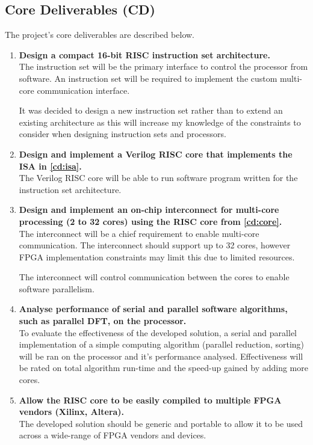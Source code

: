 \documentclass[11pt,a4paper]{report}
\begin{document}
{\subsection{Core Deliverables (CD)}
The project's core deliverables are described below.
\begin{enumerate}[leftmargin=2\parindent, label=\bfseries CD\arabic*]
\item{\textbf{Design a compact 16-bit RISC instruction set architecture.}\\
The instruction set will be the primary interface to control the processor from software. An instruction set will be required to implement the custom multi-core communication interface.

It was decided to design a new instruction set rather than to extend an existing architecture as this will increase my knowledge of the constraints to consider when designing instruction sets and processors.
}
\label{cd:isa}

\item{\textbf{Design and implement a Verilog RISC core that implements the ISA in \ref{cd:isa}.}\\
The Verilog RISC core will be able to run software program written for the instruction set architecture.
}\label{cd:core}

\item{\textbf{Design and implement an on-chip interconnect for multi-core processing (2 to 32 cores) using the RISC core from \ref{cd:core}.}\\
The interconnect will be a chief requirement to enable multi-core communication. The interconnect should support up to 32 cores, however FPGA implementation constraints may limit this due to limited resources.

The interconnect will control communication between the cores to enable software parallelism.
}\label{cd:interconnect}

\item{\textbf{Analyse performance of serial and parallel software algorithms, such as parallel DFT, on the processor.}\\
To evaluate the effectiveness of the developed solution, a serial and parallel implementation of a simple computing algorithm (parallel reduction, sorting) will be ran on the processor and it's performance analysed. Effectiveness will be rated on total algorithm run-time and the speed-up gained by adding more cores.
}\label{cd:software}

\item{\textbf{Allow the RISC core to be easily compiled to multiple FPGA vendors (Xilinx, Altera).}\\
The developed solution should be generic and portable to allow it to be used across a wide-range of FPGA vendors and devices.

}
\end{enumerate}}
\end{document}
